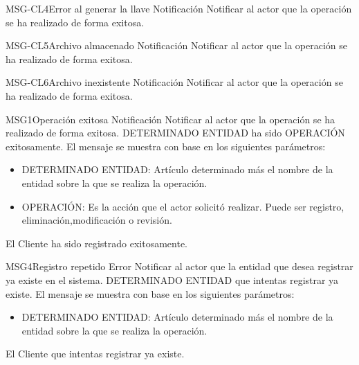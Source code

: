 \begin{Message}{MSG-CL4}{Error al generar la llave} 
	\MSGitem[Tipo: ] Notificación
	\MSGitem[Objetivo: ] Notificar al actor que la operación se ha realizado de forma exitosa.
	\MSGitem[Redacción: ]
	\MSGitem[Ejemplo: ] 
\end{Message}

\begin{Message}{MSG-CL5}{Archivo almacenado} 
	\MSGitem[Tipo: ] Notificación
	\MSGitem[Objetivo: ] Notificar al actor que la operación se ha realizado de forma exitosa.
	\MSGitem[Redacción: ]
	\MSGitem[Ejemplo: ] 
\end{Message}

\begin{Message}{MSG-CL6}{Archivo inexistente} 
	\MSGitem[Tipo: ] Notificación
	\MSGitem[Objetivo: ] Notificar al actor que la operación se ha realizado de forma exitosa.
	\MSGitem[Redacción: ]
	\MSGitem[Ejemplo: ] 
\end{Message}

\begin{Message}{MSG1}{Operación exitosa} 
	\MSGitem[Tipo: ] Notificación
	\MSGitem[Objetivo: ] Notificar al actor que la operación se ha realizado de forma exitosa.
	\MSGitem[Redacción: ] DETERMINADO ENTIDAD ha sido OPERACIÓN exitosamente. 
	\MSGitem[Parámetros: ] El mensaje se muestra con base en los siguientes parámetros:
		\begin{itemize}	
			\item DETERMINADO ENTIDAD: Artículo determinado más el nombre de la entidad sobre la que se realiza la operación.
			\item OPERACIÓN: Es la acción que el actor solicitó realizar. Puede ser registro,  eliminación,modificación o revisión.
		\end{itemize}		
	\MSGitem[Ejemplo: ] El Cliente ha sido registrado exitosamente.
\end{Message}

\begin{Message}{MSG4}{Registro repetido} 
	\MSGitem[Tipo: ] Error
	\MSGitem[Objetivo: ] Notificar al actor que la entidad que desea registrar ya existe en el sistema.
	\MSGitem[Redacción: ] DETERMINADO ENTIDAD que intentas registrar ya existe.
	\MSGitem[Parámetros: ] El mensaje se muestra con base en los siguientes parámetros:
		\begin{itemize}	
			\item DETERMINADO ENTIDAD: Artículo determinado más el nombre de la entidad sobre la que se realiza la operación.
		\end{itemize}		
	\MSGitem[Ejemplo: ] El Cliente que intentas registrar ya existe.
\end{Message}

